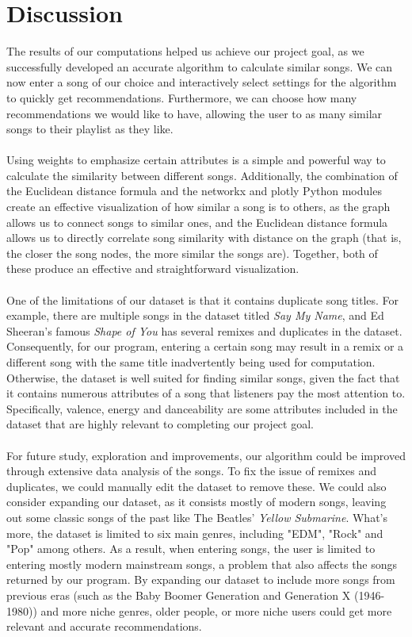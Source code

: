 \documentclass[fontsize=11pt]{article}
\begin{document}
\section*{Discussion}
The results of our computations helped us achieve our project goal, as we successfully developed an accurate algorithm to calculate similar songs. We can now enter a song of our choice and interactively select settings for the algorithm to quickly get recommendations. Furthermore, we can choose how many recommendations we would like to have, allowing the user to as many similar songs to their playlist as they like.\\
\\
Using weights to emphasize certain attributes is a simple and powerful way to calculate the similarity between different songs. Additionally, the combination of the Euclidean distance formula and the networkx and plotly Python modules create an effective visualization of how similar a song is to others, as the graph allows us to connect songs to similar ones, and the Euclidean distance formula allows us to directly correlate song similarity with distance on the graph (that is, the closer the song nodes, the more similar the songs are). Together, both of these produce an effective and straightforward visualization.\\
\\
One of the limitations of our dataset is that it contains duplicate song titles. For example, there are multiple songs in the dataset titled \textit{Say My Name}, and Ed Sheeran's famous \textit{Shape of You} has several remixes and duplicates in the dataset. Consequently, for our program, entering a certain song may result in a remix or a different song with the same title inadvertently being used for computation.\\
Otherwise, the dataset is well suited for finding similar songs, given the fact that it contains numerous attributes of a song that listeners pay the most attention to. Specifically, valence, energy and danceability are some attributes included in the dataset that are highly relevant to completing our project goal.\\
\\
For future study, exploration and improvements, our algorithm could be improved through extensive data analysis of the songs. To fix the issue of remixes and duplicates, we could manually edit the dataset to remove these. We could also consider expanding our dataset, as it consists mostly of modern songs, leaving out some classic songs of the past like The Beatles' \textit{Yellow Submarine}. What's more, the dataset is limited to six main genres, including "EDM", "Rock" and "Pop" among others. As a result, when entering songs, the user is limited to entering mostly modern mainstream songs, a problem that also affects the songs returned by our program. By expanding our dataset to include more songs from previous eras (such as the Baby Boomer Generation and Generation X (1946-1980)) and more niche genres, older people, or more niche users could get more relevant and accurate recommendations.\\
\end{document}
